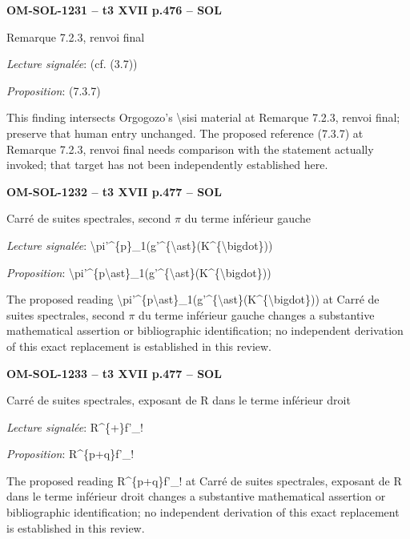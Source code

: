 \par\noindent\textbf{OM-SOL-1231 -- t3 XVII p.476 -- SOL}\par
Remarque 7.2.3, renvoi final\par
\emph{Lecture signalée}: (cf. (3.7))\par
\emph{Proposition}: (7.3.7)\par
This finding intersects Orgogozo's \textbackslash{}sisi material at Remarque 7.2.3, renvoi final; preserve that human entry unchanged. The proposed reference (7.3.7) at Remarque 7.2.3, renvoi final needs comparison with the statement actually invoked; that target has not been independently established here.\par
\par\noindent\textbf{OM-SOL-1232 -- t3 XVII p.477 -- SOL}\par
Carré de suites spectrales, second \ensuremath{\pi} du terme inférieur gauche\par
\emph{Lecture signalée}: \textbackslash{}pi'\textasciicircum{}\{p\}\_1(g'\textasciicircum{}\{\textbackslash{}ast\}(K\textasciicircum{}\{\textbackslash{}bigdot\}))\par
\emph{Proposition}: \textbackslash{}pi'\textasciicircum{}\{p\textbackslash{}ast\}\_1(g'\textasciicircum{}\{\textbackslash{}ast\}(K\textasciicircum{}\{\textbackslash{}bigdot\}))\par
The proposed reading \textbackslash{}pi'\textasciicircum{}\{p\textbackslash{}ast\}\_1(g'\textasciicircum{}\{\textbackslash{}ast\}(K\textasciicircum{}\{\textbackslash{}bigdot\})) at Carré de suites spectrales, second \ensuremath{\pi} du terme inférieur gauche changes a substantive mathematical assertion or bibliographic identification; no independent derivation of this exact replacement is established in this review.\par
\par\noindent\textbf{OM-SOL-1233 -- t3 XVII p.477 -- SOL}\par
Carré de suites spectrales, exposant de R dans le terme inférieur droit\par
\emph{Lecture signalée}: R\textasciicircum{}\{+\}f'\_!\par
\emph{Proposition}: R\textasciicircum{}\{p+q\}f'\_!\par
The proposed reading R\textasciicircum{}\{p+q\}f'\_! at Carré de suites spectrales, exposant de R dans le terme inférieur droit changes a substantive mathematical assertion or bibliographic identification; no independent derivation of this exact replacement is established in this review.\par
